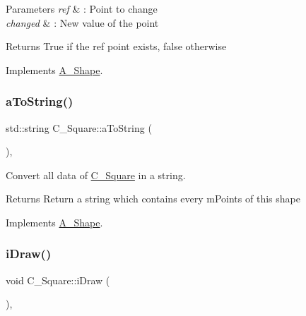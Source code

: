 \begin{DoxyParams}{Parameters}
{\em ref} & \+: Point to change \\
\hline
{\em changed} & \+: New value of the point \\
\hline
\end{DoxyParams}
\begin{DoxyReturn}{Returns}
True if the ref point exists, false otherwise 
\end{DoxyReturn}


Implements \hyperlink{classA__Shape_a6996f454b337f8425ad13cba3f7a7c35}{A\+\_\+\+Shape}.

\mbox{\label{classC__Square_ab2cada51b25cd35b9a79e461767e56f0}} 
\subsubsection{\texorpdfstring{a\+To\+String()}{aToString()}}
{\footnotesize\ttfamily std\+::string C\+\_\+\+Square\+::a\+To\+String (\begin{DoxyParamCaption}{ }\end{DoxyParamCaption})\hspace{0.3cm}{\ttfamily [override]}, {\ttfamily [virtual]}}



Convert all data of \hyperlink{classC__Square}{C\+\_\+\+Square} in a string. 

\begin{DoxyReturn}{Returns}
Return a string which contains every m\+Points of this shape 
\end{DoxyReturn}


Implements \hyperlink{classA__Shape_ad8804b4e74543db374af6892367b7c2e}{A\+\_\+\+Shape}.

\mbox{\label{classC__Square_ae6c51a7720576bcbb94b52584552df28}} 
\subsubsection{\texorpdfstring{i\+Draw()}{iDraw()}\hspace{0.1cm}{\footnotesize\ttfamily [1/2]}}
{\footnotesize\ttfamily void C\+\_\+\+Square\+::i\+Draw (\begin{DoxyParamCaption}{ }\end{DoxyParamCaption})\hspace{0.3cm}{\ttfamily [override]}, {\ttfamily [virtual]}}



